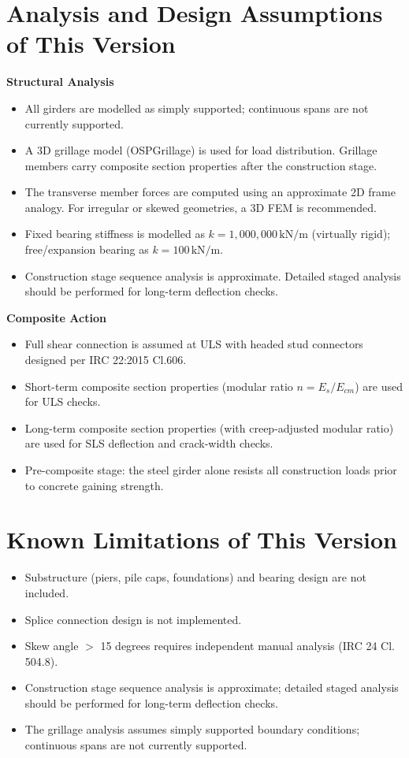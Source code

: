 \documentclass[12pt,a4paper]{report}
\numberwithin{table}{chapter}
\numberwithin{figure}{chapter}
\begin{document}
\clearpage
\section{Analysis and Design Assumptions of This Version}
\label{sec:assumptions}

\textbf{Structural Analysis}

\begin{itemize}
    \item All girders are modelled as simply supported; continuous spans are not currently supported.
    \item A 3D grillage model (OSPGrillage) is used for load distribution. Grillage members carry composite section properties after the construction stage.
    \item The transverse member forces are computed using an approximate 2D frame analogy. For irregular or skewed geometries, a 3D FEM is recommended.
    \item Fixed bearing stiffness is modelled as $k = 1{,}000{,}000 \,\text{kN/m}$ (virtually rigid); free/expansion bearing as $k = 100 \, \text{kN/m}$.
    \item Construction stage sequence analysis is approximate. Detailed staged analysis should be performed for long-term deflection checks.
\end{itemize}

\textbf{Composite Action}

\begin{itemize}
    \item Full shear connection is assumed at ULS with headed stud connectors designed per IRC 22:2015 Cl.606.
    \item Short-term composite section properties (modular ratio $n = E_s/E_{cm}$) are used for ULS checks.
    \item Long-term composite section properties (with creep-adjusted modular ratio) are used for SLS deflection and crack-width checks.
    \item Pre-composite stage: the steel girder alone resists all construction loads prior to concrete gaining strength.
\end{itemize}


\section{Known Limitations of This Version}
\label{sec:limitations}

\begin{itemize}
\item Substructure (piers, pile caps, foundations) and bearing design are not included.
\item Splice connection design is not implemented.
\item Skew angle $>$ 15 degrees requires independent manual analysis (IRC 24 Cl. 504.8).
\item Construction stage sequence analysis is approximate; detailed staged analysis
  should be performed for long-term deflection checks.
\item The grillage analysis assumes simply supported boundary conditions;
  continuous spans are not currently supported.
\end{itemize}
\end{document}
